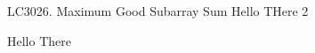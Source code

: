 
\begin{problem}{LC3026. Maximum Good Subarray Sum}
    Hello THere 2
\end{problem}

\begin{solution}

    \begin{code3}
        Hello There
    \end{code3}
\end{solution}
